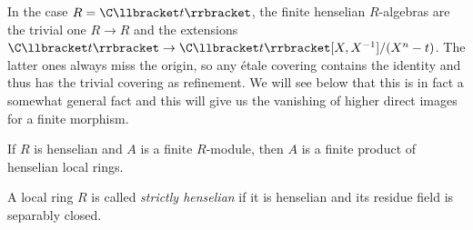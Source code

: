
\begin{example}
In the case $R = \C \llbracket t \rrbracket$, the finite henselian $R$-algebras are the trivial one $R \to R$ and the extensions $ \C \llbracket t \rrbracket \to \C \llbracket t \rrbracket [X, X^{-1}]/(X^n-t)$. The latter ones always miss the origin, so any \'etale covering contains the identity and thus has the trivial covering as refinement. We will see below that this is in fact a somewhat general fact and this will give us the vanishing of higher direct images for a finite morphism.
\end{example}

\begin{cor} \label{cor:FiniteOverHenselianIs Henselian}
If $R$ is henselian and $A$ is a finite $R$-module, then $A$ is a finite product of henselian local rings. 
\end{cor}

\begin{defi} 
A local ring $R$ is called \emph{strictly henselian} if it is henselian and its residue field is separably closed. 
\end{defi}

